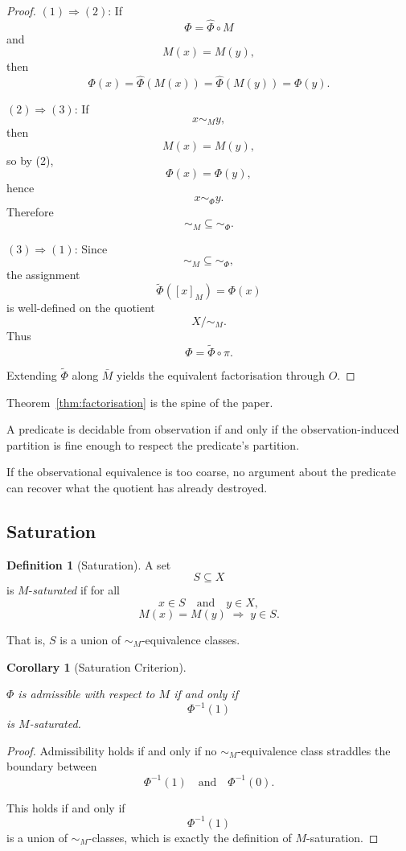 \documentclass[12pt]{article}
\theoremstyle{plain}
\newtheorem{corollary}[theorem]{Corollary}
\theoremstyle{definition}
\newtheorem{definition}[theorem]{Definition}
\theoremstyle{remark}
\begin{document}
\begin{proof}

$(1)\Rightarrow(2)$:
If
\[
\Phi = \hat{\Phi} \circ M
\]
and
\[
M(x) = M(y),
\]
then
\[
\Phi(x)
=
\hat{\Phi}(M(x))
=
\hat{\Phi}(M(y))
=
\Phi(y).
\]

$(2)\Rightarrow(3)$:
If
\[
x \sim_M y,
\]
then
\[
M(x) = M(y),
\]
so by (2),
\[
\Phi(x) = \Phi(y),
\]
hence
\[
x \sim_{\Phi} y.
\]
Therefore
\[
\sim_M \subseteq \sim_{\Phi}.
\]

$(3)\Rightarrow(1)$:
Since
\[
\sim_M \subseteq \sim_{\Phi},
\]
the assignment
\[
\widetilde{\Phi}([x]_M) = \Phi(x)
\]
is well-defined on the quotient
\[
X/{\sim_M}.
\]
Thus
\[
\Phi = \widetilde{\Phi} \circ \pi.
\]

Extending $\widetilde{\Phi}$ along $\bar{M}$ yields the equivalent
factorisation through $O$.
\end{proof}

Theorem~\ref{thm:factorisation} is the spine of the paper.

A predicate is decidable from observation if and only if the
observation-induced partition is fine enough to respect the
predicate's partition.

If the observational equivalence is too coarse, no argument about the
predicate can recover what the quotient has already destroyed.

\subsection{Saturation}

\begin{definition}[Saturation]

A set
\[
S \subseteq X
\]
is $M$-\emph{saturated} if for all
\[
x \in S
\quad\text{and}\quad
y \in X,
\]
\[
M(x) = M(y)
\;\Rightarrow\;
y \in S.
\]

That is, $S$ is a union of $\sim_M$-equivalence classes.
\end{definition}

\begin{corollary}[Saturation Criterion]
\label{cor:saturation}

$\Phi$ is admissible with respect to $M$ if and only if
\[
\Phi^{-1}(1)
\]
is $M$-saturated.
\end{corollary}

\begin{proof}

Admissibility holds if and only if no $\sim_M$-equivalence class
straddles the boundary between
\[
\Phi^{-1}(1)
\quad\text{and}\quad
\Phi^{-1}(0).
\]

This holds if and only if
\[
\Phi^{-1}(1)
\]
is a union of $\sim_M$-classes, which is exactly the definition of
$M$-saturation.
\end{proof}
\end{document}

